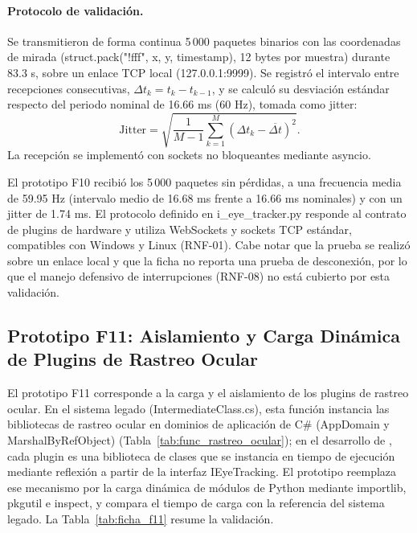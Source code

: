 \paragraph{Protocolo de validación.} Se transmitieron de forma continua 5\,000 paquetes binarios con las coordenadas de mirada (struct.pack("!fff", x, y, timestamp), 12 bytes por muestra) durante 83.3 s, sobre un enlace TCP local (127.0.0.1:9999). Se registró el intervalo entre recepciones consecutivas, $\Delta t_k = t_k - t_{k-1}$, y se calculó su desviación estándar respecto del periodo nominal de 16.66 ms (60 Hz), tomada como jitter:
\[ \mathrm{Jitter} = \sqrt{\frac{1}{M-1} \sum_{k=1}^{M} \left(\Delta t_k - \overline{\Delta t}\right)^2}. \]
La recepción se implementó con sockets no bloqueantes mediante asyncio.
 
El prototipo F10 recibió los 5\,000 paquetes sin pérdidas, a una frecuencia media de 59.95 Hz (intervalo medio de 16.68 ms frente a 16.66 ms nominales) y con un jitter de 1.74 ms. El protocolo definido en i\_eye\_tracker.py responde al contrato de plugins de hardware y utiliza WebSockets y sockets TCP estándar, compatibles con Windows y Linux (RNF-01). Cabe notar que la prueba se realizó sobre un enlace local y que la ficha no reporta una prueba de desconexión, por lo que el manejo defensivo de interrupciones (RNF-08) no está cubierto por esta validación.
 
\subsection{Prototipo F11: Aislamiento y Carga Dinámica de Plugins de Rastreo Ocular}
 
El prototipo F11 corresponde a la carga y el aislamiento de los plugins de rastreo ocular. En el sistema legado (IntermediateClass.cs), esta función instancia las bibliotecas de rastreo ocular en dominios de aplicación de C\# (AppDomain y MarshalByRefObject) (Tabla~\ref{tab:func_rastreo_ocular}); en el desarrollo de \cite{estay2020integracion}, cada plugin es una biblioteca de clases que se instancia en tiempo de ejecución mediante reflexión a partir de la interfaz IEyeTracking. El prototipo reemplaza ese mecanismo por la carga dinámica de módulos de Python mediante importlib, pkgutil e inspect, y compara el tiempo de carga con la referencia del sistema legado. La Tabla~\ref{tab:ficha_f11} resume la validación.
 
